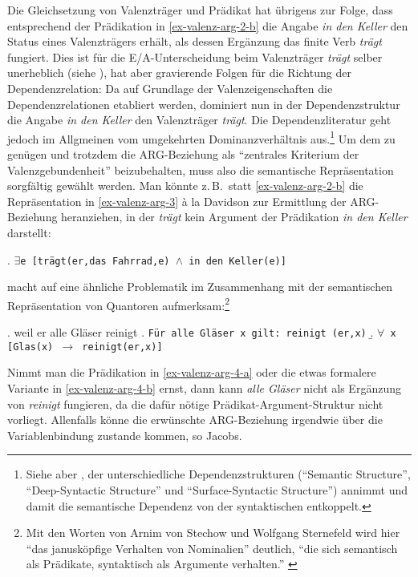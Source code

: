 Die Gleichsetzung von Valenzträger und Prädikat hat übrigens zur Folge, dass entsprechend der Prädikation in \ref{ex-valenz-arg-2-b} die Angabe {\it in den Keller} den Status eines Valenzträgers erhält, als dessen Ergänzung das finite Verb {\it trägt} fungiert. Dies ist für die E/A-Unterscheidung beim Valenzträger {\it trägt} selber unerheblich (siehe \citealt[59]{Jacobs:94}), hat aber gravierende Folgen für die Richtung der Dependenzrelation: Da auf Grundlage der Valenzeigenschaften die Dependenzrelationen etabliert werden, dominiert nun in der Dependenzstruktur die Angabe {\it in den Keller} den Valenzträger {\it trägt}. Die  Dependenzliteratur geht jedoch im Allgmeinen vom umgekehrten Dominanzverhältnis aus.\footnote{Siehe aber \citet[5--7]{Melcuk:09}, der unterschiedliche Dependenzstrukturen ("`Semantic Structure"', "`Deep-Syntactic Structure"' und "`Surface-Syntactic Structure"') annimmt und damit die semantische Dependenz von der syntaktischen entkoppelt.} Um dem zu genügen und trotzdem die ARG-Beziehung als "`zentrales Kriterium der Valenzgebundenheit"' \citep[768]{Storrer:03} beizubehalten, muss also die semantische Repräsentation sorgfältig gewählt werden. Man könnte z.\,B.\ statt \ref{ex-valenz-arg-2-b} die Repräsentation in \ref{ex-valenz-arg-3} \`a la Davidson zur Ermittlung der ARG-Beziehung heranziehen, in der {\it trägt} kein Argument der Prädikation {\it in den Keller} darstellt:  

\ex. \label{ex-valenz-arg-3} {\tt $\exists$e [trägt(er,das Fahrrad,e) $\wedge$ in den Keller(e)]}

\citet[19f]{Jacobs:94} macht auf eine ähnliche Problematik im Zusammenhang mit der semantischen Repräsentation von Quantoren aufmerksam:\footnote{Mit den Worten von Arnim von Stechow und Wolfgang Sternefeld wird hier "`das janusköpfige Verhalten von Nominalien"' deutlich, "`die sich semantisch als Prädikate, syntaktisch als Argumente verhalten."' \citep[71]{Stechow:Sternefeld:88}}    

\ex. \label{ex-valenz-arg-4} weil er alle Gläser reinigt \hfill \citep[(12)]{Jacobs:94}
\a. \label{ex-valenz-arg-4-a} {\tt Für alle Gläser x gilt: reinigt (er,x)}     \hfill \citep[(12a)]{Jacobs:94}
\b. \label{ex-valenz-arg-4-b} {\tt $\forall$ x [Glas(x) $\to$ reinigt(er,x)]}

Nimmt man die Prädikation in \ref{ex-valenz-arg-4-a} oder die etwas formalere Variante in \ref{ex-valenz-arg-4-b} ernst, dann kann {\it alle Gläser} nicht als Ergänzung von {\it reinigt} fungieren, da die dafür nötige Prädikat-Argument-Struktur nicht vorliegt. Allenfalls könne die erwünschte ARG-Beziehung irgendwie über die Variablenbindung zustande kommen, so Jacobs.

